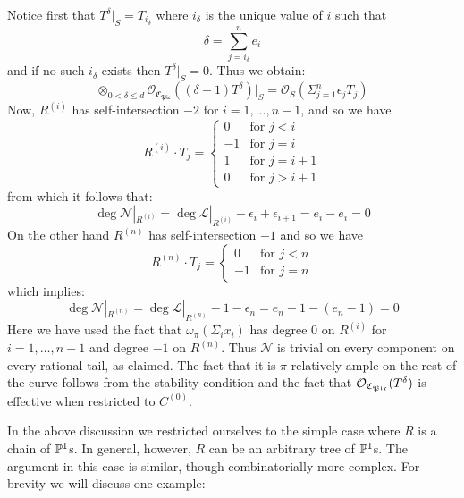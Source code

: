 Notice first that $T^\delta|_S = T_{i_\delta}$ where $i_\delta$ is the unique value of $i$ such that
\begin{equation*} \delta = \sum_{j=i_{\delta}}^n e_i \end{equation*}
and if no such $i_\delta$ exists then $T^\delta|_S = 0$. Thus we obtain:
\begin{equation*} \otimes_{0<\delta\leq d}\mathcal{O}_{\mathfrak{C}_{\mathfrak{Pic}}}((\delta-1) T^\delta)|_S = \mathcal{O}_S(\Sigma_{j=1}^n \epsilon_j T_j) \end{equation*}
Now, $R^{(i)}$ has self-intersection $-2$ for $i=1,\ldots,n-1$, and so we have
\begin{equation*}
R^{(i)}\cdot T_j =
  \begin{cases}
    0 & \text{for } j<i \\
    -1 & \text{for } j=i \\
    1 & \text{for } j=i+1 \\
    0 & \text{for } j>i+1
  \end{cases}
\end{equation*}
from which it follows that:
\begin{equation*} \deg \mathcal{N}|_{R^{(i)}} = \deg \mathcal{L}|_{R^{(i)}} - \epsilon_i + \epsilon_{i+1} = e_i - e_i = 0 \end{equation*}
On the other hand $R^{(n)}$ has self-intersection $-1$ and so we have
\begin{equation*}
R^{(n)} \cdot T_j =
\begin{cases}
0 & \text{for } j < n \\
-1 & \text{for } j = n
\end{cases}
\end{equation*}
which implies:
\begin{equation*} \deg \mathcal{N}|_{R^{(n)}} = \deg \mathcal{L}|_{R^{(n)}} - 1 - \epsilon_n = e_n - 1 - (e_n-1) = 0\end{equation*}
Here we have used the fact that $\omega_\pi(\Sigma_i x_i)$ has degree $0$ on $R^{(i)}$ for $i=1,\ldots,n-1$ and degree $-1$ on $R^{(n)}$. Thus $\mathcal{N}$ is trivial on every component on every rational tail, as claimed. The fact that it is $\pi$-relatively ample on the rest of the curve follows from the stability condition and the fact that $\mathcal{O}_{\mathfrak{C}_{\mathfrak{Pic}}}(T^\delta)$ is effective when restricted to $C^{(0)}$.

In the above discussion we restricted ourselves to the simple case where $R$ is a chain of $\mathbb P^1$s. In general, however, $R$ can be an arbitrary tree of $\mathbb P^1$s. The argument in this case is similar, though combinatorially more complex. For brevity we will discuss one example:


